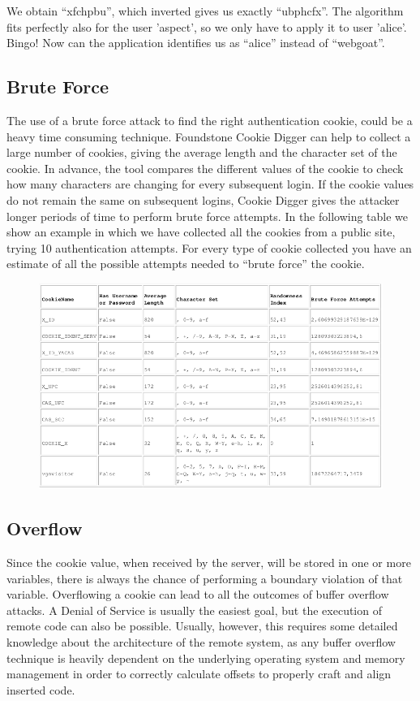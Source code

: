 			We obtain “xfchpbu”, which inverted gives us exactly “ubphcfx”. The algorithm fits 
			perfectly also for the user 'aspect', so we only have to apply it to user 'alice'.
			Bingo! Now can the application identifies us as “alice” instead of “webgoat”.

		\subsection{Brute Force}

		The use of a brute force attack to find the right authentication cookie, could be a 
		heavy time consuming technique. Foundstone Cookie Digger can help to collect a large 
		number of cookies, giving the average length and the character set of the cookie. 
		In advance, the tool compares the different values of the cookie to check how many 
		characters are changing for every subsequent login. If the cookie values do not 
		remain the same on subsequent logins, Cookie Digger gives the attacker longer periods 
		of time to perform brute force attempts. In the following table we show an example 
		in which we have collected all the cookies from a public site, trying 10 authentication 
		attempts. For every type of cookie collected you have an estimate of all the possible 
		attempts needed to “brute force” the cookie.

		\begin{figure}[H]
			\includegraphics[width=\textwidth]{pics/bruteforce.png}
		\end{figure}

		\subsection{Overflow}
			Since the cookie value, when received by the server, will be stored in one or more 
			variables, there is always the chance of performing a boundary violation of that 
			variable. Overflowing a cookie can lead to all the outcomes of buffer overflow
			attacks. A Denial of Service is usually the easiest goal, but the execution of 
			remote code can also be possible. Usually, however, this requires some detailed 
			knowledge about the architecture of the remote system, as any buffer overflow
			technique is heavily dependent on the underlying operating system and memory 
			management in order to correctly calculate offsets to properly craft and align 
			inserted code.


